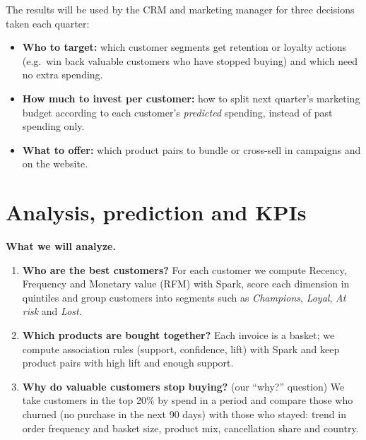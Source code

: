 \documentclass[11pt,a4paper]{article}
\begin{document}
The results will be used by the CRM and marketing manager for three decisions taken each quarter:
\begin{itemize}
  \item \textbf{Who to target:} which customer segments get retention or loyalty actions (e.g.\ win back
        valuable customers who have stopped buying) and which need no extra spending.
  \item \textbf{How much to invest per customer:} how to split next quarter's marketing budget according to
        each customer's \emph{predicted} spending, instead of past spending only.
  \item \textbf{What to offer:} which product pairs to bundle or cross-sell in campaigns and on the website.
\end{itemize}

\section{Analysis, prediction and KPIs}
\textbf{What we will analyze.}
\begin{enumerate}
  \item \textbf{Who are the best customers?} For each customer we compute Recency, Frequency and Monetary
        value (RFM) with Spark, score each dimension in quintiles and group customers into segments such
        as \emph{Champions}, \emph{Loyal}, \emph{At risk} and \emph{Lost}.
  \item \textbf{Which products are bought together?} Each invoice is a basket; we compute association rules
        (support, confidence, lift) with Spark and keep product pairs with high lift and enough support.
  \item \textbf{Why do valuable customers stop buying?} (our ``why?'' question) We take customers in the
        top 20\% by spend in a period and compare those who churned (no purchase in the next 90 days) with
        those who stayed: trend in order frequency and basket size, product mix, cancellation share and country.
\end{enumerate}
\end{document}
